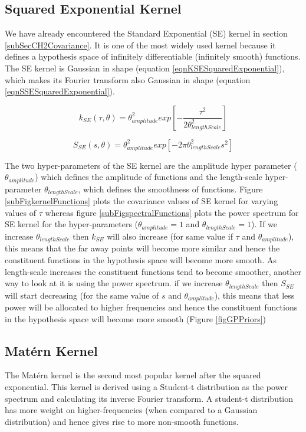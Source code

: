 \subsection{Squared Exponential Kernel}\label{subSecCh4SEKernel}
We have already encountered the Standard Exponential (SE) kernel in section \ref{subSecCH2Covariance}. It is one of the most widely used kernel because it defines a hypothesis space of infinitely differentiable (infinitely smooth) functions. The SE kernel is Gaussian in shape (equation \ref{eqnKSESquaredExponential}), which makes its Fourier transform also Gaussian in shape (equation \ref{eqnSSESquaredExponential}).  

\begin{equation}\label{eqnKSESquaredExponential}
k_{SE}(\tau, \theta) = \theta_{amplitude}^2exp[-\frac{\tau^2}{2\theta_{lengthScale}^2}]
\end{equation}

\begin{equation}\label{eqnSSESquaredExponential}
S_{SE}(s, \theta) = \theta_{amplitude}^2  exp[-2\pi \theta_{lengthScale}^2 s^2]
\end{equation}

The two hyper-parameters of the SE kernel are the amplitude hyper parameter (\(\theta_{amplitude}\)) which defines the amplitude of functions and the length-scale hyper-parameter \(\theta_{lengthScale}\), which defines the smoothness of functions. Figure \ref{subFigkernelFunctions} plots the covariance values of SE kernel for varying values of \(\tau\) whereas figure \ref{subFigspectralFunctions} plots the power spectrum for SE kernel for the hyper-parameters (\(\theta_{amplitude}=1\) and \(\theta_{lengthScale}=1\)). If we increase \(\theta_{lengthScale}\) then \(k_{SE}\) will also increase (for same value if \(\tau\) and \(\theta_{amplitude}\)), this means that the far away points will become more similar and hence the constituent functions in the hypothesis space will become more smooth. As length-scale increases the constituent functions tend to become smoother, another way to look at it is using the power spectrum. if we increase \(\theta_{lengthScale}\) then \(S_{SE}\) will start decreasing (for the same value of \(s\) and \(\theta_{amplitude}\)), this means that less power will be allocated to higher frequencies and hence the constituent functions in the hypothesis space will become more smooth (Figure \ref{figGPPriors})

\subsection{Mat\'ern Kernel}\label{subsecCh4MaternKernel}
The Mat\'ern kernel is the second most popular kernel after the squared exponential. This kernel is derived using a Student-t distribution as the power spectrum and calculating its inverse Fourier transform. A student-t distribution has more weight on higher-frequencies (when compared to a Gaussian distribution) and hence gives rise to more non-smooth functions. 

